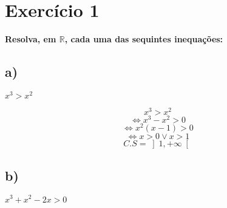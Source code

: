 \documentclass[a4paper]{article}
\begin{document}
	
\section*{Exercício 1}\textbf{Resolva, em $\mathbb{R}$, cada uma das sequintes inequações:}
	\subsection*{a)}\textbf{$x^3>x^2$}
	
	\[x^3>x^2\]
	\[\Leftrightarrow x^3-x^2>0\]
	\[\Leftrightarrow x^2\left(x-1\right)>0\]
	\[\Leftrightarrow x>0 \lor x>1\]
	\[C.S=\left]1,+\infty\right[\]
	
\subsection*{b)}\textbf{$x^3+x^2-2x>0$}
\end{document}
